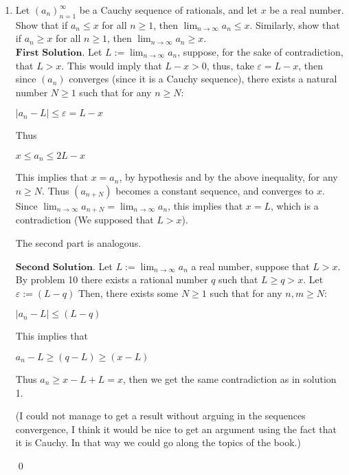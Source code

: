 \documentclass{article}
\theoremstyle{remark}
\begin{document}
\begin{enumerate}
        For the converse it is straightforward, since $x \leq y$, then $x \leq y + \varepsilon$.

        \begin{flushright}
            \qed
        \end{flushright}
        \item Let \( (a_n)_{n=1}^{\infty} \) be a Cauchy sequence of rationals, and let \( x \) be a real number. 
        Show that if \( a_n \leq x \) for all \( n \geq 1 \), then \( \lim_{n \to \infty} a_n \leq x \). 
        Similarly, show that if \( a_n \geq x \) for all \( n \geq 1 \), then \( \lim_{n \to \infty} a_n \geq x \).\\
        $\textbf{First Solution.}$
        Let $L := \lim_{n\to\infty}a_n$, suppose, for the sake of contradiction, that $L>x$.
        This would imply that $L-x > 0$, thus, take $\varepsilon = L-x$, then since $(a_n)$ converges (since it is a Cauchy sequence), there exists
        a natural number $N \geq 1$ such that for any $n \geq N$:
        \begin{center}
            $\vert a_n - L\vert \leq \varepsilon = L - x$
        \end{center}
        Thus
        \begin{center}
            $x \leq a_n \leq 2L - x$
        \end{center}
        This implies that $x = a_n$, by hypothesis and by the above inequality, for any $n \geq N$.
        Thus $(a_{n+N})$ becomes a constant sequence, and converges to $x$.
        Since $\lim_{n\to \infty}a_{n+N} = \lim_{n\to \infty}a_{n}$, this implies that $x = L$, which is a contradiction (We supposed that $L>x$).
        
        The second part is analogous.

        $\textbf{Second Solution.}$
        Let $L := \lim_{n \to \infty}a_n$ a real number, suppose that $L > x$. By problem 10 there exists a rational number $q$ such that $L\geq q > x$.
        Let $\varepsilon := (L-q)$
        Then, there exists some $N\geq 1$ such that for any $n,m \geq N$:
        \begin{center}
            $\vert a_n - L \vert \leq (L-q)$
        \end{center}
        This implies that 
        \begin{center}
            $a_n - L \geq (q-L) \geq (x - L)$
        \end{center}
        Thus 
        $a_n \geq x - L + L = x$, then we get the same contradiction as in solution 1.

        (I could not manage to get a result without arguing in the sequences convergence, I think it would be nice to get an argument using the fact that it is Cauchy. In that way
        we could go along the topics of the book.)
        \begin{flushright}
            \qed
        \end{flushright}
    \end{enumerate}
\end{document}
